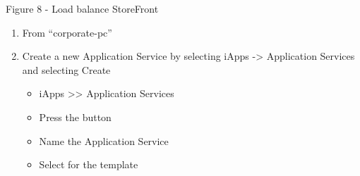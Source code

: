 \documentclass[letterpaper,10pt,english]{sphinxmanual}
\begin{document}
Figure 8 - Load balance StoreFront

\begin{enumerate}
\item {} 
From “corporate-pc”

\item {} 
Create a new Application Service by selecting iApps -\textgreater{} Application
Services and selecting Create
\begin{itemize}
\item {} 
iApps \textgreater{}\textgreater{} Application Services

\item {} 
Press the  button

\item {} 
Name the Application Service 

\item {} 
Select  for the template

\end{itemize}

\end{enumerate}
\end{document}
